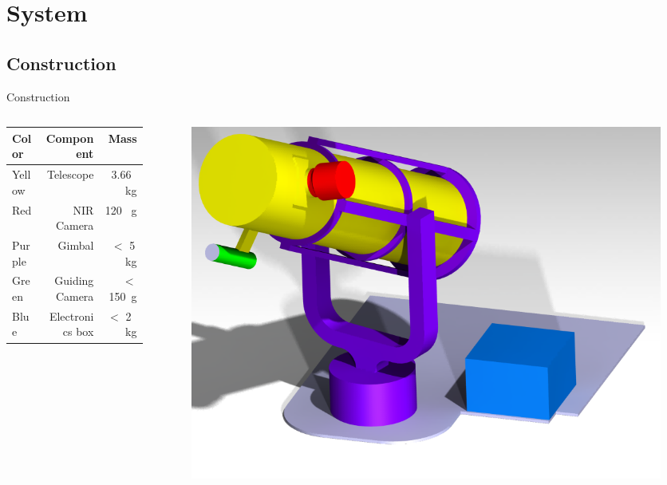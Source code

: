 \documentclass[11pt, aspectratio=169]{beamer}
\begin{document}
\section{System}
\subsection{Construction}	 	%

\begin{frame}{Construction}
\begin{columns}
	\begin{column}{0.6\textwidth}
		\begin{tabular}{l|r|r}
		Color & Component & Mass \\ \hline
		Yellow & Telescope & 3.66 \, kg \\ 
		Red & NIR Camera & 120 \, g \\ 
		Purple & Gimbal & $<$ 5\, kg\\
		Green & Guiding Camera & $<$ 150 \,g \\
		Blue & Electronics box  & $<$ 2 \,kg
	\end{tabular}
	\end{column}
	\begin{column}{0.4\textwidth}
	\begin{figure}
	\hspace{-3cm}
	\centering
	\includegraphics[scale=0.8]{figures/CAD/Outside_Gondola/Experiment.png}
	\end{figure}
	\end{column}
\end{columns}
\end{frame}
\end{document}
